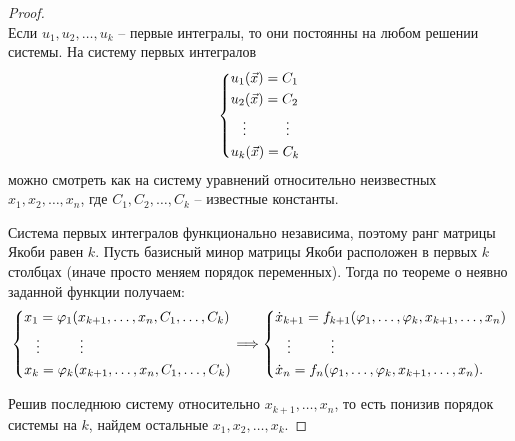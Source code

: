 	\begin{proof}
		\hfill\\
		Если $u_1, u_2, \ldots, u_k$ -- первые интегралы, то они постоянны на любом решении системы. На систему первых интегралов
		\begin{equation}
			\begin{cases*}
				u_1(\vec{x}) = C_1 \\ 
				u_2(\vec{x}) = C_2 \\
				\hspace{3mm}\vdots \hspace{10mm} \vdots \\
				u_k(\vec{x}) = C_k
			\end{cases*}
		\end{equation}
		можно смотреть как на систему уравнений относительно неизвестных $x_1, x_2, \ldots, x_n$, где $C_1, C_2, \ldots, C_k$ -- известные константы.
	
		Система первых интегралов функционально независима, поэтому ранг матрицы Якоби равен $k$. Пусть базисный минор матрицы Якоби расположен в первых $k$ столбцах (иначе просто меняем порядок переменных). Тогда по теореме о неявно заданной функции получаем:
		\begin{equation}
			\begin{cases*}
				x_1 = \varphi_1(x_{k+1}, \ldots, x_n, C_1, \ldots, C_k) \\
				\hspace{3mm} \vdots \hspace{10mm} \vdots \\
				x_k = \varphi_k(x_{k+1}, \ldots, x_n, C_1, \ldots, C_k) \\
			\end{cases*} \Longrightarrow
			\begin{cases*}
				\dot{x}_{k+1} = f_{k+1}(\varphi_1, \ldots, \varphi_k, x_{k+1}, \ldots, x_n) \\
				\hspace{3mm} \vdots \hspace{10mm} \vdots \\
				\dot{x}_{n} = f_{n}(\varphi_1, \ldots, \varphi_k, x_{k+1}, \ldots, x_n).
			\end{cases*}
		\end{equation}
	
		Решив последнюю систему относительно $x_{k+1}, \ldots, x_n$, то есть понизив порядок системы на $k$, найдем остальные $x_1, x_2, \ldots, x_k$.
	\end{proof}